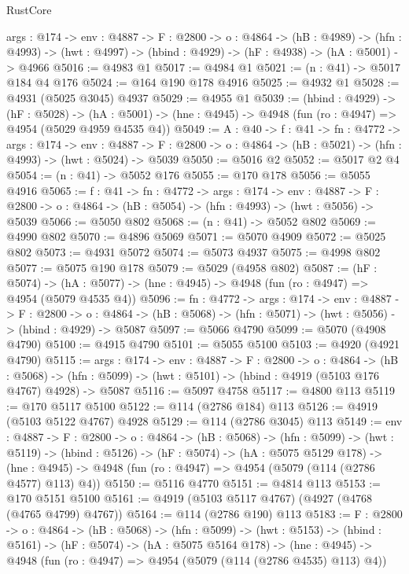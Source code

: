 \begin{lexlean}{RustCore}
\begin{coremodule}
  {args : @174} ->
  {env : @4887} ->
  {F : @2800} ->
  {o : @4864} ->
  (hB : @4989) ->
  (hfn : @4993) -> (hwt : @4997) -> (hbind : @4929) -> (hF : @4938) -> (hA : @5001) -> @4966
@5016 := @4983 @1
@5017 := @4984 @1
@5021 := (n : @41) -> @5017 @184 @4 @176
@5024 := @164 @190 @178 @4916
@5025 := @4932 @1
@5028 := @4931 (@5025 @3045) @4937
@5029 := @4955 @1
@5039 := (hbind : @4929) ->
  (hF : @5028) ->
  (hA : @5001) -> (hne : @4945) -> @4948 (fun (ro : @4947) => @4954 (@5029 @4959 @4535 @4))
@5049 := {A : @40} ->
  {f : @41} ->
  {fn : @4772} ->
  {args : @174} ->
  {env : @4887} ->
  {F : @2800} -> {o : @4864} -> (hB : @5021) -> (hfn : @4993) -> (hwt : @5024) -> @5039
@5050 := @5016 @2
@5052 := @5017 @2 @4
@5054 := (n : @41) -> @5052 @176
@5055 := @170 @178
@5056 := @5055 @4916
@5065 := {f : @41} ->
  {fn : @4772} ->
  {args : @174} ->
  {env : @4887} ->
  {F : @2800} -> {o : @4864} -> (hB : @5054) -> (hfn : @4993) -> (hwt : @5056) -> @5039
@5066 := @5050 @802
@5068 := (n : @41) -> @5052 @802
@5069 := @4990 @802
@5070 := @4896 @5069
@5071 := @5070 @4909
@5072 := @5025 @802
@5073 := @4931 @5072
@5074 := @5073 @4937
@5075 := @4998 @802
@5077 := @5075 @190 @178
@5079 := @5029 (@4958 @802)
@5087 := (hF : @5074) ->
  (hA : @5077) -> (hne : @4945) -> @4948 (fun (ro : @4947) => @4954 (@5079 @4535 @4))
@5096 := {fn : @4772} ->
  {args : @174} ->
  {env : @4887} ->
  {F : @2800} ->
  {o : @4864} -> (hB : @5068) -> (hfn : @5071) -> (hwt : @5056) -> (hbind : @4929) -> @5087
@5097 := @5066 @4790
@5099 := @5070 (@4908 @4790)
@5100 := @4915 @4790
@5101 := @5055 @5100
@5103 := @4920 (@4921 @4790)
@5115 := {args : @174} ->
  {env : @4887} ->
  {F : @2800} ->
  {o : @4864} ->
  (hB : @5068) ->
  (hfn : @5099) -> (hwt : @5101) -> (hbind : @4919 (@5103 @176 @4767) @4928) -> @5087
@5116 := @5097 @4758
@5117 := @4800 @113
@5119 := @170 @5117 @5100
@5122 := @114 (@2786 @184) @113
@5126 := @4919 (@5103 @5122 @4767) @4928
@5129 := @114 (@2786 @3045) @113
@5149 := {env : @4887} ->
  {F : @2800} ->
  {o : @4864} ->
  (hB : @5068) ->
  (hfn : @5099) ->
  (hwt : @5119) ->
  (hbind : @5126) ->
  (hF : @5074) ->
  (hA : @5075 @5129 @178) ->
  (hne : @4945) -> @4948 (fun (ro : @4947) => @4954 (@5079 (@114 (@2786 @4577) @113) @4))
@5150 := @5116 @4770
@5151 := @4814 @113
@5153 := @170 @5151 @5100
@5161 := @4919 (@5103 @5117 @4767) (@4927 (@4768 (@4765 @4799) @4767))
@5164 := @114 (@2786 @190) @113
@5183 := {F : @2800} ->
  {o : @4864} ->
  (hB : @5068) ->
  (hfn : @5099) ->
  (hwt : @5153) ->
  (hbind : @5161) ->
  (hF : @5074) ->
  (hA : @5075 @5164 @178) ->
  (hne : @4945) -> @4948 (fun (ro : @4947) => @4954 (@5079 (@114 (@2786 @4535) @113) @4))

\end{coremodule}
\end{lexlean}
